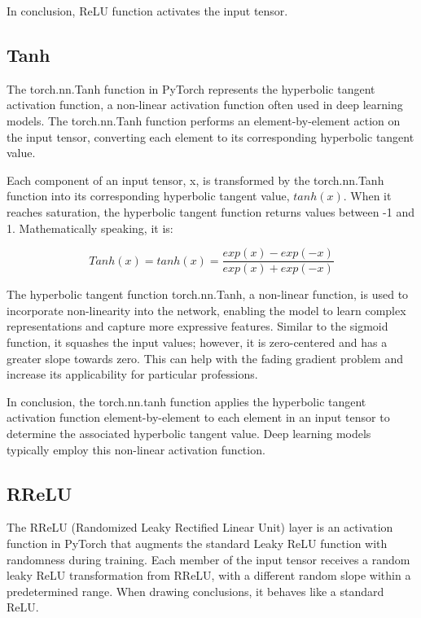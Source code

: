 In conclusion, ReLU function activates the input tensor.

\subsection{Tanh}

The torch.nn.Tanh function in PyTorch represents the hyperbolic tangent activation function, a non-linear activation function often used in deep learning models. The torch.nn.Tanh function performs an element-by-element action on the input tensor, converting each element to its corresponding hyperbolic tangent value.

Each component of an input tensor, x, is transformed by the torch.nn.Tanh function into its corresponding hyperbolic tangent value, $tanh(x)$. When it reaches saturation, the hyperbolic tangent function returns values between -1 and 1. Mathematically speaking, it is:


\begin{equation}
    Tanh(x) = tanh(x) = \frac{exp(x) - exp(-x)}{exp(x) + exp(-x)}
\end{equation}

The hyperbolic tangent function torch.nn.Tanh, a non-linear function, is used to incorporate non-linearity into the network, enabling the model to learn complex representations and capture more expressive features. Similar to the sigmoid function, it squashes the input values; however, it is zero-centered and has a greater slope towards zero. This can help with the fading gradient problem and increase its applicability for particular professions.

In conclusion, the torch.nn.tanh function applies the hyperbolic tangent activation function element-by-element to each element in an input tensor to determine the associated hyperbolic tangent value. Deep learning models typically employ this non-linear activation function.


\subsection{RReLU}

The RReLU (Randomized Leaky Rectified Linear Unit) layer is an activation function in PyTorch that augments the standard Leaky ReLU function with randomness during training. Each member of the input tensor receives a random leaky ReLU transformation from RReLU, with a different random slope within a predetermined range. When drawing conclusions, it behaves like a standard ReLU.

